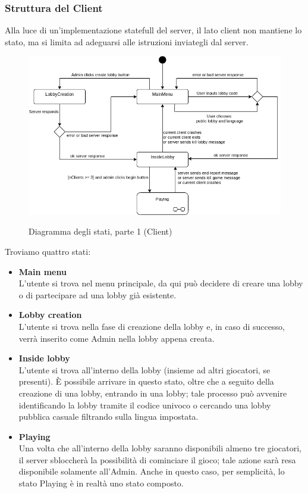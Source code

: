 \subsubsection{Struttura del Client}
Alla luce di un'implementazione statefull del server, il lato client non mantiene lo stato, ma si limita ad adeguarsi alle istruzioni inviategli dal server.

\begin{figure}[H]
    \caption{Diagramma degli stati, parte 1 (Client)}
    \centering
    \includegraphics[width=150mm]{img/ingSoft/State Client.png}
    \label{fig:client_state_simple}
\end{figure}

\noindent Troviamo quattro stati:
\begin{itemize}
    \item {\textbf{Main menu}}\\
    L'utente si trova nel menu principale, da qui può decidere di creare una lobby o di partecipare ad una lobby già esistente.
    \item {\textbf{Lobby creation}}\\
    L'utente si trova nella fase di creazione della lobby e, in caso di successo, verrà inserito come Admin nella lobby appena creata.
    \item {\textbf{Inside lobby}}\\
    L'utente si trova all'interno della lobby (insieme ad altri giocatori, se presenti).\newline
    È possibile arrivare in questo stato, oltre che a seguito della creazione di una lobby, entrando in una lobby; tale processo può avvenire identificando la lobby tramite il codice univoco o cercando una lobby pubblica casuale filtrando sulla lingua impostata.
    \item {\textbf{Playing}}\\
    Una volta che all'interno della lobby saranno disponibili almeno tre giocatori, il server sbloccherà la possibilità di cominciare il gioco; tale azione sarà resa disponibile solamente all'Admin. Anche in questo caso, per semplicità, lo stato Playing è in realtà uno stato composto.
\end{itemize}

